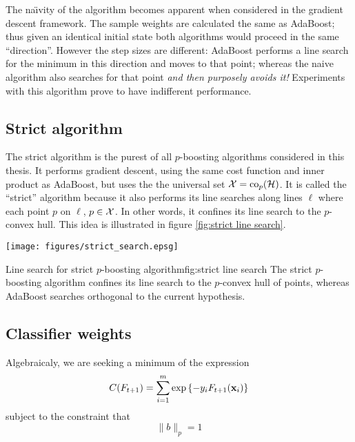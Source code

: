 The na\"{\i}vity of the algorithm becomes apparent when considered in
the gradient descent framework.  The sample weights are calculated
the same as AdaBoost; thus given an identical initial state both
algorithms would proceed in the same ``direction''.  However the step
sizes are different: AdaBoost performs a line search for the minimum
in this direction and moves to that point; whereas the naive algorithm
also searches for that point \emph{and then purposely avoids it!}
Experiments with this algorithm prove to have indifferent performance.

\subsection{Strict algorithm}

The strict algorithm is the purest of all $p$-boosting algorithms
considered in this thesis.  It performs gradient descent, using the
same cost function and inner product as AdaBoost, but uses the the
universal set $\mathcal{X} = \mathrm{co}_p(\mathcal{H})$.  It is called the ``strict''
algorithm because it also performs its line searches along lines
$\ell$ where each point $p$ on $\ell$, $p \in \mathcal{X}$.  In other words,
it confines its line search to the $p$-convex hull.  This idea is
illustrated in figure \ref{fig:strict line search}.

\begin{linefigure}
\begin{center}
\texttt{[image: figures/strict\_search.epsg]}
\end{center}
\begin{capt}{Line search for strict $p$-boosting algorithm}{fig:strict line search}
The strict $p$-boosting algorithm confines its line search to the
$p$-convex hull of points, whereas AdaBoost searches orthogonal to the
current hypothesis.
\end{capt}
\end{linefigure}

\subsection{Classifier weights}

Algebraicaly, we are seeking a minimum of the expression
%
\begin{equation}
\label{eqn:classifier weight cost function approximation}
C(F_{t+1}) = \sum_{i=1}^{m} \exp \left\{ -y_i F_{t+1}(\mathbf{x}_i) \right\}
\end{equation}
%
subject to the constraint that
%
\begin{equation}
\| b \|_{p} = 1
\end{equation}

